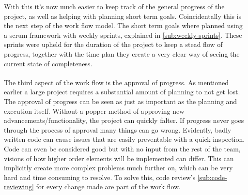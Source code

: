 With this it's now much easier to keep track of the general progress of the project, as well as helping with planning short term goals. Coincidentally this is the next step of the work flow model. The short term goals where planned using a scrum framework with weekly sprints, explained in \ref{sub:weekly-sprints}. These sprints were upheld for the duration of the project to keep a stead flow of progress, together with the time plan they create a very clear way of seeing the current state of completeness. 
\\\\
The third aspect of the work flow is the approval of progress. As mentioned earlier a large project requires a substantial amount of planning to not get lost. The approval of progress can be seen as just as important as the planning and execution itself. Without a popper method of approving new advancements/functionality, the project can quickly falter. If progress never goes through the process of approval many things can go wrong. Evidently, badly written code can cause issues that are easily preventable with a quick inspection. Code can even be considered good but with no input from the rest of the team, visions of how higher order elements will be implemented can differ. This can implicitly create  more complex problems much further on, which can be very hard and time consuming to resolve. To solve this, code review's \ref{sub:code-reviewing} for every change made are part of the work flow.  

